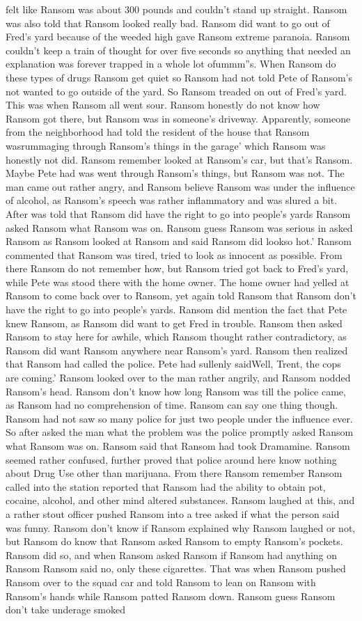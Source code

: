 \documentclass[12pt]{book}
\begin{document}
felt like Ransom was about 300 pounds and couldn't stand up straight. Ransom was also told that Ransom looked really bad. Ransom did want to go out of Fred's yard because of the weeded high gave Ransom extreme paranoia. Ransom couldn't keep a train of thought for over five seconds so anything that needed an explanation was forever trapped in a whole lot ofummm''s. When Ransom do these types of drugs Ransom get quiet so Ransom had not told Pete of Ransom's not wanted to go outside of the yard. So Ransom treaded on out of Fred's yard. This was when Ransom all went sour. Ransom honestly do not know how Ransom got there, but Ransom was in someone's driveway. Apparently, someone from the neighborhood had told the resident of the house that Ransom wasrummaging through Ransom's things in the garage' which Ransom was honestly not did. Ransom remember looked at Ransom's car, but that's Ransom. Maybe Pete had was went through Ransom's things, but Ransom was not. The man came out rather angry, and Ransom believe Ransom was under the influence of alcohol, as Ransom's speech was rather inflammatory and was slured a bit. After was told that Ransom did have the right to go into people's yards Ransom asked Ransom what Ransom was on. Ransom guess Ransom was serious in asked Ransom as Ransom looked at Ransom and said Ransom did lookso hot.' Ransom commented that Ransom was tired, tried to look as innocent as possible. From there Ransom do not remember how, but Ransom tried got back to Fred's yard, while Pete was stood there with the home owner. The home owner had yelled at Ransom to come back over to Ransom, yet again told Ransom that Ransom don't have the right to go into people's yards. Ransom did mention the fact that Pete knew Ransom, as Ransom did want to get Fred in trouble. Ransom then asked Ransom to stay here for awhile, which Ransom thought rather contradictory, as Ransom did want Ransom anywhere near Ransom's yard. Ransom then realized that Ransom had called the police. Pete had sullenly saidWell, Trent, the cops are coming.' Ransom looked over to the man rather angrily, and Ransom nodded Ransom's head. Ransom don't know how long Ransom was till the police came, as Ransom had no comprehension of time. Ransom can say one thing though. Ransom had not saw so many police for just two people under the influence ever. So after asked the man what the problem was the police promptly asked Ransom what Ransom was on. Ransom said that Ransom had took Dramamine. Ransom seemed rather confused, further proved that police around here know nothing about Drug Use other than marijuana. From there Ransom remember Ransom called into the station reported that Ransom had the ability to obtain pot, cocaine, alcohol, and other mind altered substances. Ransom laughed at this, and a rather stout officer pushed Ransom into a tree asked if what the person said was funny. Ransom don't know if Ransom explained why Ransom laughed or not, but Ransom do know that Ransom asked Ransom to empty Ransom's pockets. Ransom did so, and when Ransom asked Ransom if Ransom had anything on Ransom Ransom said no, only these cigarettes. That was when Ransom pushed Ransom over to the squad car and told Ransom to lean on Ransom with Ransom's hands while Ransom patted Ransom down. Ransom guess Ransom don't take underage smoked 
\end{document}
